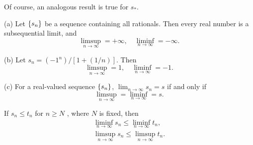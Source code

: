 Of course, an analogous result is true for $s_*$.

\begin{myExample}    
(a) Let $\protect\{s_n\}$  be a sequence containing all rationals. Then every real number is a subsequential limit, and
\begin{equation*}
    \limsup_{n\rightarrow\infty} = +\infty,\quad
    \liminf_{n\rightarrow\infty} = -\infty.
\end{equation*}

(b) Let $s_n=(-1^n)/[1 + (1/n)]$. Then
\begin{equation*}
    \limsup_{n\rightarrow\infty} = 1,\quad
    \liminf_{n\rightarrow\infty} = -1.
\end{equation*}

(c) For a real-valued sequence $\protect\{s_n\}$, $\lim_{n \to \infty} s_n = s$ if and only if
\begin{equation*}
    \limsup_{n\rightarrow\infty} = 
    \liminf_{n\rightarrow\infty} = s.
\end{equation*}
\end{myExample}

\begin{thm}
    \label{thm:3.19}
    If $s_n \leq t_n$ for $n \geq N$ , where $N$ is fixed, then
    \begin{align*}
        \liminf_{n \rightarrow \infty} s_n \leq \liminf_{n \rightarrow \infty} t_n,\\
        \limsup_{n \rightarrow \infty} s_n \leq \limsup_{n \rightarrow \infty} t_n.
    \end{align*}
\end{thm}